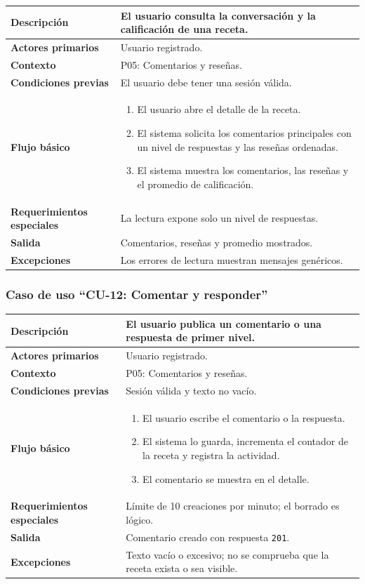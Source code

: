 \documentclass[doc,12pt,a4paper]{apa7}
\begin{document}
\begin{longtable}{|P{3.3cm}|L{11.2cm}|}
\hline
\textbf{Descripción} & El usuario consulta la conversación y la calificación de una receta. \\ \hline
\textbf{Actores primarios} & Usuario registrado. \\ \hline
\textbf{Contexto} & P05: Comentarios y reseñas. \\ \hline
\textbf{Condiciones previas} & El usuario debe tener una sesión válida. \\ \hline
\textbf{Flujo básico} &
\begin{enumerate}
    \item El usuario abre el detalle de la receta.
    \item El sistema solicita los comentarios principales con un nivel de respuestas y las reseñas ordenadas.
    \item El sistema muestra los comentarios, las reseñas y el promedio de calificación.
\end{enumerate} \\ \hline
\textbf{Requerimientos especiales} & La lectura expone solo un nivel de respuestas. \\ \hline
\textbf{Salida} & Comentarios, reseñas y promedio mostrados. \\ \hline
\textbf{Excepciones} & Los errores de lectura muestran mensajes genéricos. \\ \hline
\end{longtable}

\subsubsection{Caso de uso ``CU-12: Comentar y responder''}

\begin{longtable}{|P{3.3cm}|L{11.2cm}|}
\hline
\textbf{Descripción} & El usuario publica un comentario o una respuesta de primer nivel. \\ \hline
\textbf{Actores primarios} & Usuario registrado. \\ \hline
\textbf{Contexto} & P05: Comentarios y reseñas. \\ \hline
\textbf{Condiciones previas} & Sesión válida y texto no vacío. \\ \hline
\textbf{Flujo básico} &
\begin{enumerate}
    \item El usuario escribe el comentario o la respuesta.
    \item El sistema lo guarda, incrementa el contador de la receta y registra la actividad.
    \item El comentario se muestra en el detalle.
\end{enumerate} \\ \hline
\textbf{Requerimientos especiales} & Límite de 10 creaciones por minuto; el borrado es lógico. \\ \hline
\textbf{Salida} & Comentario creado con respuesta \texttt{201}. \\ \hline
\textbf{Excepciones} & Texto vacío o excesivo; no se comprueba que la receta exista o sea visible. \\ \hline
\end{longtable}
\end{document}
